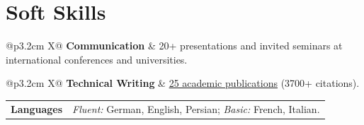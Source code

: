 \documentclass[10pt, a4paper]{article}
\makeatletter
\newcommand{\cvskill}[2]{%
  \noindent
    \begin{tabularx}{\linewidth}{@{}p{3.2cm} X@{}}
    \textbf{\small #1} & {\small #2}
  \end{tabularx}\raggedright%
}
\makeatother
\begin{document}
\section{Soft Skills}
\cvskill{Communication}{20+ presentations and invited seminars at international conferences and universities.}
\cvskill{Technical Writing}{\href{https://inspirehep.net/authors/1730808}{25 academic publications} (3700+ citations).}
\cvskill{Languages}{\textit{Fluent:} German, English, Persian; \quad \textit{Basic:} French, Italian.}






\end{document}
